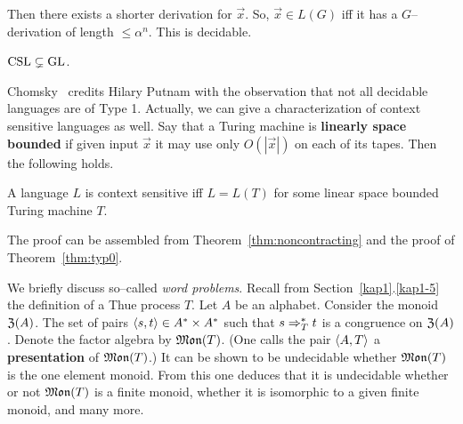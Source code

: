 Then there exists a shorter derivation for $\vec{x}$.
So, $\vec{x} \in L(G)$ iff it has a
$G$--derivation of length $\leq \alpha^n$. This is
decidable.
\proofend
\begin{cor}
\label{0-1-echt}
$\mbox{\rm CSL} \subsetneq \mbox{\rm GL}$.
\end{cor}
Chomsky~ credits Hilary Putnam 
with the observation that not all decidable languages are of Type 1.
Actually, we can give a characterization of context sensitive
languages as well. Say that a Turing machine is \textbf{linearly
space bounded} 
if given input $\vec{x}$ it may use only
$O(|\vec{x}|)$ on each of its tapes. Then the following holds.
\nocite{myhill:lba}
\nocite{landweber:three}
\nocite{kuroda:classes}
\begin{thm}
A language $L$ is context sensitive iff $L = L(T)$
for some linear space bounded Turing machine $T$.
\end{thm}
The proof can be assembled from Theorem~\ref{thm:noncontracting}
and the proof of Theorem~\ref{thm:typ0}.

We briefly discuss so--called {\it word problems}. Recall from
Section~\ref{kap1}.\ref{kap1-5} the definition of a Thue process $T$. Let
$A$ be an alphabet. Consider the monoid $\mathfrak{Z}(A)$. The set of
pairs $\langle s, t\rangle \in A^{\ast} \times A^{\ast}$ such that
$s \Rightarrow^{\ast}_T t$ is a congruence on $\mathfrak{Z}(A)$. Denote the
factor algebra by $\mathfrak{Mon}(T)$. (One calls the pair 
$\langle A, T\rangle$ a \textbf{presentation} 
of $\mathfrak{Mon}(T)$.)
It can be shown to be undecidable whether $\mathfrak{Mon}(T)$ is
the one element monoid. From this one deduces that it is
undecidable whether or not $\mathfrak{Mon}(T)$ is a finite
monoid, whether it is isomorphic to a given finite monoid,
and many more.

